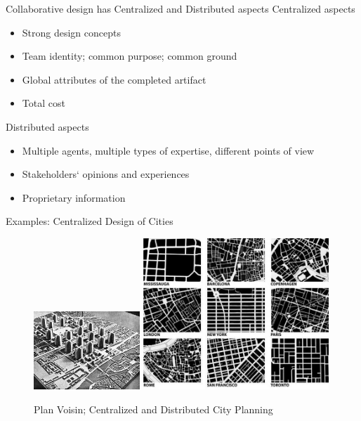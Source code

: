 \documentclass[handout]{beamer}
\begin{document}
\begin{frame}{Collaborative design has Centralized and Distributed aspects}
Centralized aspects
\begin{itemize}
	\item Strong design concepts
	\item Team identity; common purpose; common ground
	\item Global attributes of the completed artifact
	\item Total cost
\end{itemize}
\bigskip
\pause
Distributed aspects
\begin{itemize}
	\item Multiple agents, multiple types of expertise, different points of view
	\item Stakeholders` opinions and experiences
	\item Proprietary information
\end{itemize}
\end{frame}



\begin{frame}{Examples: Centralized Design of Cities}
\begin{figure}
\caption{Plan Voisin; Centralized and Distributed City Planning}
  	\includegraphics[width=4cm]{images/leCorb01.jpg}
	\pause
    	\includegraphics[width=7cm]{images/city-grids.jpg}
      
\end{figure}
\end{frame}
\end{document}
